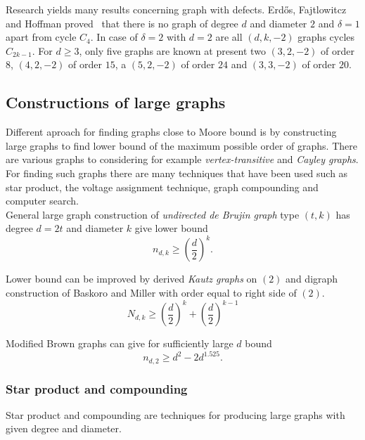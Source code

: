 \documentclass[a4paper,11pt,twoside]{report}%
\begin{document}
Research yields many results concerning graph with defects. Erdős, Fajtlowitcz and Hoffman proved~\cite{Erdos-Fajtlowicz-Hoffman} that there is no graph of degree $d$ and diameter $2$ and $\delta = 1$ apart from cycle $C_{4}$.  
In case of  $\delta = 2$ with $d = 2$ are all $(d,k,-2)$ graphs cycles $C_{2k-1}$. For $d \geq 3$, only five graphs are known at present two $(3,2,-2)$ of order $8$, $(4,2,-2)$ of order $15$, a $(5,2,-2)$ of order $24$ and $(3,3,-2)$ of order $20$.

\subsection{Constructions of large graphs}
Different aproach for finding graphs close to Moore bound is by constructing large graphs to find lower bound of the maximum possible order of graphs. There are various graphs to considering for example \textit{vertex-transitive} and \textit{Cayley graphs}. For finding such graphs there are many techniques that have been used such as star product, the voltage assignment technique, graph compounding and computer search. \\

General large graph construction of \textit{undirected de Brujin graph} type $(t,k)$ has degree $d = 2t$ and diameter $k$ give lower bound
\begin{equation*}
	n_{d,k} \geq \left( \frac{d}{2} \right)^{k}.
\end{equation*}

Lower bound can be improved by derived \textit{Kautz graphs} on $(2)$ and digraph construction of Baskoro and Miller with order equal to right side of $(2)$.%
\begin{equation}
	N_{d,k} \geq \left( \frac{d}{2} \right)^{k} +  \left( \frac{d}{2} \right)^{k-1}
\end{equation}	

Modified Brown graphs can give for sufficiently large $d$ bound %
\begin{equation*}
	n_{d,2} \geq d^{2} - 2d^{1.525}.
\end{equation*}	

\subsubsection{Star product and compounding}

Star product and compounding are techniques for producing large graphs with given degree and diameter. \\
\end{document}
